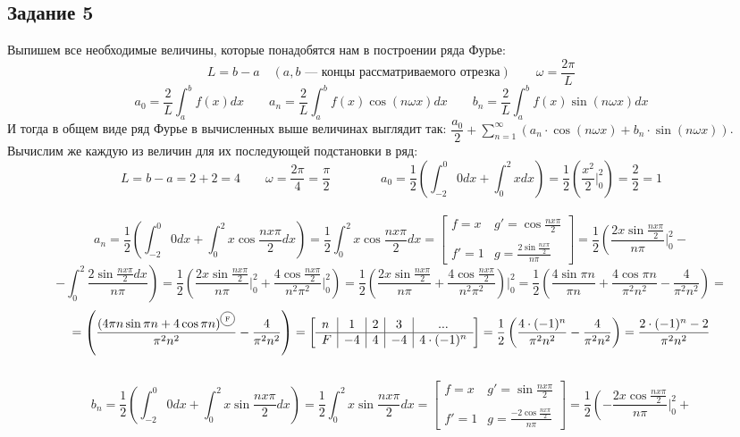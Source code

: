 \documentclass{article}
\newcommand*\circled[1]{\tikz[baseline= (char.base)]{
            \node[shape=circle,draw,inner sep=2pt] (char) {#1};}}
\newcommand{\at}{\biggr\rvert}
\begin{document}
\subsection*{Задание 5}
Выпишем все необходимые величины, которые понадобятся нам в построении ряда Фурье:
$$L = b - a\quad (a, b\text{ --- концы рассматриваемого отрезка})\qquad \omega = \frac{2\pi}{L}$$
$$a_0 = \frac{2}{L}\int_{a}^{b}f(x)dx \qquad a_n = \frac{2}{L}\int_{a}^{b}f(x)\cos(n\omega x)dx \qquad b_n = \frac{2}{L}\int_{a}^{b}f(x)\sin(n\omega x)dx$$
И тогда в общем виде ряд Фурье в вычисленных выше величинах выглядит так: $\dfrac{a_0}{2}+\sum\limits^{\infty}_{n = 1}(a_n\cdot\cos(n\omega x)+b_n\cdot\sin(n\omega x))$.
Вычислим же каждую из величин для их последующей подстановки в ряд:
$$L = b - a = 2 + 2 = 4 \qquad \omega = \frac{2\pi}{4} = \frac{\pi}{2} \qquad\qquad a_0 = \frac{1}{2}\left(\int_{-2}^{0}0dx + \int_{0}^{2}xdx\right) = \frac{1}{2}\left(\frac{x^2}{2}\at^{2}_0\right)=\frac{2}{2} = 1$$   \, \\
$$a_n = \frac{1}{2}\left(\int_{-2}^{0}0dx + \int_{0}^{2}x\cos\frac{nx\pi}{2}dx\right) = \frac{1}{2}\int_{0}^{2}x\cos\frac{nx\pi}{2}dx = \begin{bmatrix}
f = x & g' = \cos\frac{nx\pi}{2} \\ \, \\
f' = 1 & g = \frac{2\sin\frac{nx\pi}{2}}{n\pi}
\end{bmatrix} = \frac{1}{2}\left(\frac{2x\sin\frac{nx\pi}{2}}{n\pi}\at^{2}_{0}-\right.$$
$$\left. -\int_{0}^{2}\frac{2\sin\frac{nx\pi}{2}dx}{n\pi}\right) = \frac{1}{2}\left(\frac{2x\sin\frac{nx\pi}{2}}{n\pi}\at^{2}_{0}+\frac{4\cos\frac{nx\pi}{2}}{n^2\pi^2}\at^{2}_{0}\right) = \frac{1}{2}\left(\frac{2x\sin\frac{nx\pi}{2}}{n\pi}+\frac{4\cos\frac{nx\pi}{2}}{n^2\pi^2}\right)\at^{2}_{0} =
\frac{1}{2}\left(\frac{4\sin\pi n}{\pi n}+\frac{4\cos\pi n}{\pi^2n^2} - \frac{4}{\pi^2n^2}\right) =$$
$$= \left(\frac{(4\pi n\sin\pi n + 4\cos\pi n)^{\circled{{\tiny F}}}}{\pi^2n^2} -\frac{4}{\pi^2n^2}\right) = \left[\begin{array}{l|c|c|c|c}
n & 1 & 2 & 3 & ... \\
\hline
F & -4 & 4 & -4 & 4\cdot(-1)^n
\end{array}\right] = \frac{1}{2}\left(\frac{4 \cdot (-1)^n}{\pi^2n^2}-\frac{4}{\pi^2n^2}\right) = \frac{2 \cdot (-1)^n - 2}{\pi^2n^2}$$  \, \\
$$b_n = \frac{1}{2}\left(\int_{-2}^{0}0dx + \int_{0}^{2}x\sin\frac{nx\pi}{2}dx\right) = \frac{1}{2}\int_{0}^{2}x\sin\frac{nx\pi}{2}dx = \begin{bmatrix}
f = x & g' = \sin\frac{nx\pi}{2} \\ \, \\
f' = 1 & g = \frac{-2\cos\frac{nx\pi}{2}}{n\pi}
\end{bmatrix} = \frac{1}{2}\left(-\frac{2x\cos\frac{nx\pi}{2}}{n\pi}\at^{2}_{0}+\right.$$
\end{document}
